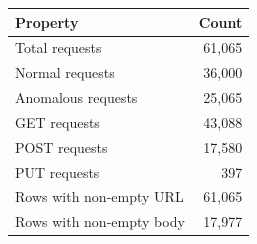 \begin{tabular}{lr}
\toprule
Property & Count \\
\midrule
Total requests & 61,065 \\
Normal requests & 36,000 \\
Anomalous requests & 25,065 \\
GET requests & 43,088 \\
POST requests & 17,580 \\
PUT requests & 397 \\
Rows with non-empty URL & 61,065 \\
Rows with non-empty body & 17,977 \\
\bottomrule
\end{tabular}
